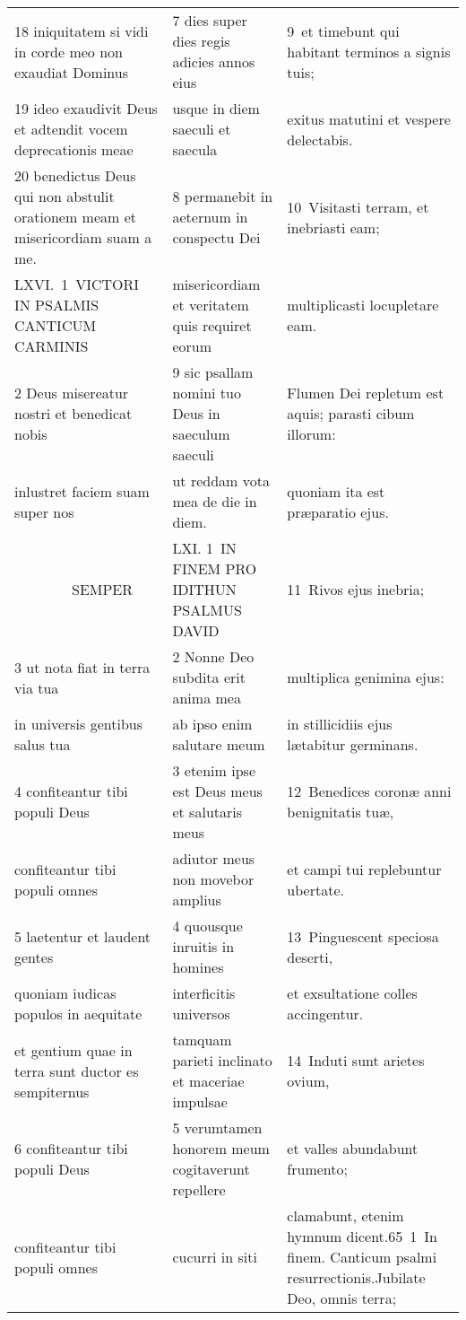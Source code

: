 \documentclass{article}
\begin{document}
\begin{longtable}{@{}p{}p{}p{}@{}}
18 iniquitatem si vidi in corde meo non exaudiat Dominus	&	7 dies super dies regis adicies annos eius	&	9 et timebunt qui habitant terminos a signis tuis;	\\
19 ideo exaudivit Deus et adtendit vocem deprecationis meae	&	usque in diem saeculi et saecula	&	exitus matutini et vespere delectabis.	\\
20 benedictus Deus qui non abstulit orationem meam et misericordiam suam a me.	&	8 permanebit in aeternum in conspectu Dei	&	10 Visitasti terram, et inebriasti eam;	\\
LXVI. 1 VICTORI IN PSALMIS CANTICUM CARMINIS	&	misericordiam et veritatem quis requiret eorum	&	multiplicasti locupletare eam.	\\
2 Deus misereatur nostri et benedicat nobis	&	9 sic psallam nomini tuo Deus in saeculum saeculi	&	Flumen Dei repletum est aquis; parasti cibum illorum:	\\
inlustret faciem suam super nos	&	ut reddam vota mea de die in diem.	&	quoniam ita est præparatio ejus.	\\
    SEMPER	&	LXI. 1 IN FINEM PRO IDITHUN PSALMUS DAVID	&	11 Rivos ejus inebria;	\\
3 ut nota fiat in terra via tua	&	2 Nonne Deo subdita erit anima mea	&	multiplica genimina ejus:	\\
in universis gentibus salus tua	&	ab ipso enim salutare meum	&	in stillicidiis ejus lætabitur germinans.	\\
4 confiteantur tibi populi Deus	&	3 etenim ipse est Deus meus et salutaris meus	&	12 Benedices coronæ anni benignitatis tuæ,	\\
confiteantur tibi populi omnes	&	adiutor meus non movebor amplius	&	et campi tui replebuntur ubertate.	\\
5 laetentur et laudent gentes	&	4 quousque inruitis in homines	&	13 Pinguescent speciosa deserti,	\\
quoniam iudicas populos in aequitate	&	interficitis universos	&	et exsultatione colles accingentur.	\\
et gentium quae in terra sunt ductor es sempiternus	&	tamquam parieti inclinato et maceriae impulsae	&	14 Induti sunt arietes ovium,	\\
6 confiteantur tibi populi Deus	&	5 verumtamen honorem meum cogitaverunt repellere	&	et valles abundabunt frumento;	\\
confiteantur tibi populi omnes	&	cucurri in siti	&	clamabunt, etenim hymnum dicent.65 1 In finem. Canticum psalmi resurrectionis.Jubilate Deo, omnis terra;	\\

\end{longtable}
\end{document}
